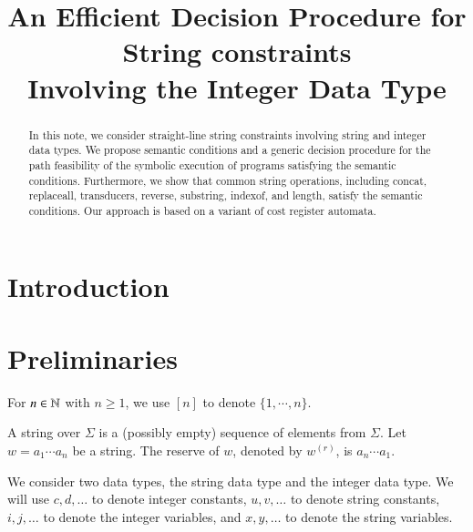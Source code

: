 \documentclass{llncs}
\title{An Efficient Decision Procedure for String constraints \\
Involving the Integer Data Type}
\author{}
\institute{ }
\begin{document}
\maketitle

\begin{abstract}
In this note, we consider straight-line string constraints involving string and integer data types. 
We propose semantic conditions and a generic decision procedure for the path feasibility of the symbolic execution of programs satisfying the semantic conditions. 
Furthermore, we show that common string operations,  including concat, replaceall, transducers, reverse, substring, indexof, and length, satisfy the semantic conditions.
Our approach is based on a variant of cost register automata.
\end{abstract}

%
%

\section{Introduction}

\section{Preliminaries}

For $n \in \mathbb{N}$ with $n \ge 1$, we use $[n]$ to denote $\{1, \cdots, n\}$.

A string over $\Sigma$ is a (possibly empty) sequence of elements from $\Sigma$. Let $w=a_1\cdots a_n$ be a string. The reserve of $w$, denoted by $w^{(r)}$, is $a_n \cdots a_1$.

We consider two data types, the string data type and the integer data type. We will use $c, d,\dots$ to denote integer constants, $u, v, \dots$ to denote string constants,  $i, j, \dots$ to denote the  integer variables, and $x, y, \dots$ to denote the string variables.
\end{document}
